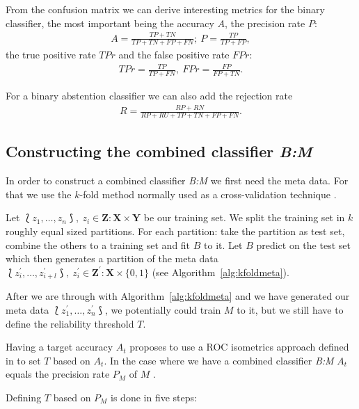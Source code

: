 \documentclass[twoside,11pt]{article}
\begin{document}
From the confusion matrix we can derive interesting metrics
for the binary classifier, the most important being the
accuracy $A$, the precision rate $P$:
\begin{align*}
A = \frac{TP + TN}{TP + TN + FP + FN};\
P = \frac{TP}{TP + FP},
\end{align*}
the true positive rate $TPr$ and the false positive rate
$FPr$:
\begin{align*}
TPr = \frac{TP}{TP + FN},\ FPr = \frac{FP}{FP + TN}.
\end{align*}

For a binary abstention classifier we can also add the
rejection rate
\begin{align*}
R = \frac{RP + RN}{RP + RU + TP + TN + FP + FN}.
\end{align*}

\subsection*{Constructing the combined classifier
             \textit{B:M}}

In order to construct a combined classifier \textit{B:M}
we first need the meta data.
For that we use the $k$-fold method normally used as a
cross-validation technique
\citep[see][Chapter 7.10]{elem_stat}.

Let $\Lbag z_1,\dots,z_n \Rbag,\ z_i \in \textbf{Z}:
\textbf{X} \times \textbf{Y}$ be our training set.
We split the training set in $k$ roughly equal sized
partitions.
For each partition: take the partition as test set,
combine the others to a training set and fit $B$ to it.
Let $B$ predict on the test set which then generates a
partition of the meta data
$\Lbag z^{\prime}_i,\dots,z^{\prime}_{i+l} \Rbag,\
z^{\prime}_i \in \textbf{Z}^{\prime}: \textbf{X} \times
\{0,1\}$ (see Algorithm~\ref{alg:kfoldmeta}).

After we are through with Algorithm~\ref{alg:kfoldmeta} and
we have generated our meta data
$\Lbag z^{\prime}_1,\dots,z^{\prime}_n \Rbag$, we
potentially could train $M$ to it, but we still have to
define the reliability threshold $T$.

Having a target accuracy $A_t$ \citet{smirnov_et_al_2009}
proposes to use a ROC isometrics approach defined in
\citet{vanderlooy_et_al_2009} to set $T$ based on $A_t$.
In the case where we have a combined classifier
\textit{B:M} $A_t$ equals the precision rate $P_M$ of $M$
\citep[see][]{smirnov_et_al_2009}.

Defining $T$ based on $P_M$ is done in five steps:
\end{document}
